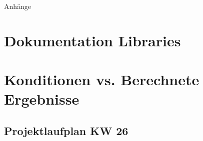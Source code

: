 %
%
%
\begin{appendix}

\newpage

\begin{center}
	\huge{Anhänge}
\end{center}

\normalsize

\section{Dokumentation Libraries}
\label{documentation_libs}


\newpage
\section{Konditionen vs. Berechnete Ergebnisse}
\label{cond_vs_results}


\newpage
\begin{landscape}
	\section{Projektlaufplan KW 26}
	\label{sec:projectplan}
	\scalebox{.75}{
		
		}
\end{landscape}


\end{appendix}
